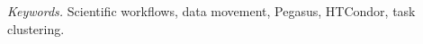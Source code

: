 \documentclass[11pt,a4paper]{report}
\begin{document}
\smallskip\noindent\textit{Keywords.} Scientific workflows, data movement, Pegasus, HTCondor, task clustering.
\begingroup
\setlength{\cftbeforechapskip}{6pt}
\tableofcontents
\endgroup
\clearpage{}\pagestyle{fancy}








\clearpage

\end{document}
